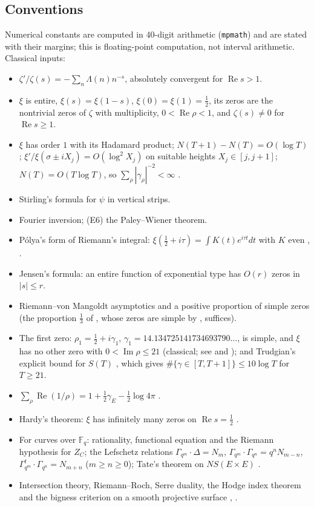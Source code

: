 \documentclass[11pt]{amsart}
\theoremstyle{definition}
\theoremstyle{remark}
\newcommand{\F}{\mathbb F}
\newcommand{\Rel}{\operatorname{Re}}
\newcommand{\Iml}{\operatorname{Im}}
\begin{document}
\subsection{Conventions}
Numerical constants are computed in 40-digit arithmetic (\texttt{mpmath}) and are stated with their
margins; this is floating-point computation, not interval arithmetic. Classical inputs:
\begin{itemize}
\item[(E1)] $\zeta'/\zeta(s)=-\sum_n\Lambda(n)n^{-s}$, absolutely convergent for $\Rel s>1$.
\item[(E2)] $\xi$ is entire, $\xi(s)=\xi(1-s)$, $\xi(0)=\xi(1)=\frac12$, its zeros are the nontrivial
zeros of $\zeta$ with multiplicity, $0<\Rel\rho<1$, and $\zeta(s)\ne0$ for $\Rel s\ge1$.
\item[(E3)] $\xi$ has order $1$ with its Hadamard product; $N(T+1)-N(T)=O(\log T)$; $\xi'/\xi(\sigma\pm iX_j)=O(\log^2X_j)$
on suitable heights $X_j\in[j,j+1]$; $N(T)=O(T\log T)$, so $\sum_\rho|\gamma_\rho|^{-2}<\infty$
\cite[Ch.~15--17]{Davenport2000}.
\item[(E4)] Stirling's formula for $\psi$ in vertical strips.
\item[(E5)] Fourier inversion; (E6) the Paley--Wiener theorem.
\item[(X1)] P\'olya's form of Riemann's integral: $\xi(\frac12+i\tau)=\int K(t)e^{i\tau t}dt$ with $K$
even \cite[\S10.1]{Titchmarsh1986}, \cite{Polya1926}.
\item[(X2)] Jensen's formula: an entire function of exponential type has $O(r)$ zeros in $|s|\le r$.
\item[(X3)] Riemann--von Mangoldt asymptotics and a positive proportion of simple zeros
\cite{Conrey1989} (the proportion $\frac13$ of \cite{Levinson1974}, whose zeros are simple by \cite{HeathBrown1979}, suffices).
\item[(X4)] The first zero: $\rho_1=\frac12+i\gamma_1$, $\gamma_1=14.134725141734693790\ldots$, is simple,
and $\xi$ has no other zero with $0<\Iml\rho\le21$ (classical; see \cite[\S15]{Titchmarsh1986} and
\cite{PlattTrudgian2021}); and Trudgian's explicit
bound for $S(T)$ \cite{Trudgian2014}, which gives $\#\{\gamma\in[T,T+1]\}\le10\log T$ for $T\ge21$.
\item[(X5)] $\sum_\rho\Rel(1/\rho)=1+\frac12\gamma_E-\frac12\log4\pi$ \cite[Ch.~12]{Davenport2000}.
\item[(X6)] Hardy's theorem: $\xi$ has infinitely many zeros on $\Rel s=\frac12$ \cite{Hardy1914}.
\item[(X7)] For curves over $\F_q$: rationality, functional equation and the Riemann hypothesis for
$Z_C$; the Lefschetz relations $\Gamma_{q^m}\cdot\Delta=N_m$,
$\Gamma_{q^m}\cdot\Gamma_{q^n}=q^nN_{m-n}$, $\Gamma_{q^m}^t\cdot\Gamma_{q^n}=N_{m+n}$ ($m\ge n\ge0$);
Tate's theorem on $NS(E\times E)$ \cite{Weil48,Tate1966}.
\item[(X8)] Intersection theory, Riemann--Roch, Serre duality, the Hodge index theorem and the
bigness criterion on a smooth projective surface \cite[Ch.~V]{Hartshorne}, \cite[\S2.2]{Lazarsfeld}.
\end{itemize}
\end{document}
